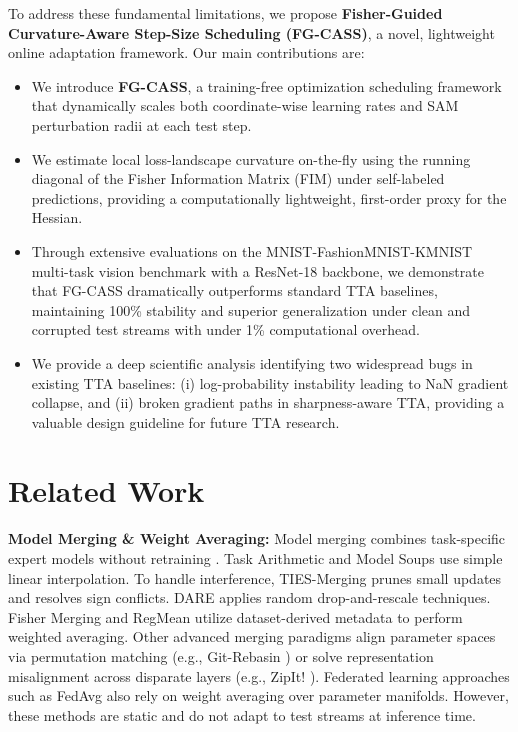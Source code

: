 \documentclass{article}
\theoremstyle{plain}
\theoremstyle{definition}
\theoremstyle{remark}
\begin{document}
To address these fundamental limitations, we propose \textbf{Fisher-Guided Curvature-Aware Step-Size Scheduling (FG-CASS)}, a novel, lightweight online adaptation framework. Our main contributions are:
\begin{itemize}
    \item We introduce \textbf{FG-CASS}, a training-free optimization scheduling framework that dynamically scales both coordinate-wise learning rates and SAM perturbation radii at each test step.
    \item We estimate local loss-landscape curvature on-the-fly using the running diagonal of the Fisher Information Matrix (FIM) under self-labeled predictions, providing a computationally lightweight, first-order proxy for the Hessian.
    \item Through extensive evaluations on the MNIST-FashionMNIST-KMNIST multi-task vision benchmark with a ResNet-18 backbone, we demonstrate that FG-CASS dramatically outperforms standard TTA baselines, maintaining 100\% stability and superior generalization under clean and corrupted test streams with under 1\% computational overhead.
    \item We provide a deep scientific analysis identifying two widespread bugs in existing TTA baselines: (i) log-probability instability leading to NaN gradient collapse, and (ii) broken gradient paths in sharpness-aware TTA, providing a valuable design guideline for future TTA research.
\end{itemize}

\section{Related Work}
\label{sec:related}
\textbf{Model Merging \& Weight Averaging:} Model merging combines task-specific expert models without retraining \cite{model_merging_survey, empirical_study_merging}. Task Arithmetic \cite{task_arithmetic} and Model Soups \cite{model_soups} use simple linear interpolation. To handle interference, TIES-Merging \cite{ties_merging} prunes small updates and resolves sign conflicts. DARE \cite{dare} applies random drop-and-rescale techniques. Fisher Merging \cite{fisher_merging} and RegMean \cite{regmean} utilize dataset-derived metadata to perform weighted averaging. Other advanced merging paradigms align parameter spaces via permutation matching (e.g., Git-Rebasin \cite{git_rebasin}) or solve representation misalignment across disparate layers (e.g., ZipIt! \cite{zipit}). Federated learning approaches such as FedAvg \cite{fedavg} also rely on weight averaging over parameter manifolds. However, these methods are static and do not adapt to test streams at inference time.
\end{document}
